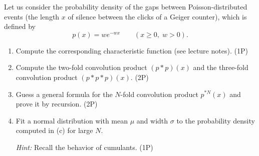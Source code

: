 \begin{Problem}
	
	Let us consider the probability density of the gaps between Poisson-distributed events
	(the length $x$ of silence between the clicks of a Geiger counter), which is defined by
	\[
	p(x)=w e^{-wx}
	\qquad (x\ge 0,\; w>0).
	\]
	
	\begin{enumerate}[label=(\alph*)]
		\item Compute the corresponding characteristic function (see lecture notes). \hfill (1P)
		
		\item Compute the two-fold convolution product $(p*p)(x)$ and the three-fold convolution
		product $(p*p*p)(x)$. \hfill (2P)
		
		\item Guess a general formula for the $N$-fold convolution product
		$p^{*N}(x)$ and prove it by recursion. \hfill (2P)
		
		\item Fit a normal distribution with mean $\mu$ and width $\sigma$ to the probability
		density computed in (c) for large $N$.
		
		\textit{Hint:} Recall the behavior of cumulants. \hfill (1P)
	\end{enumerate}
\end{Problem}
